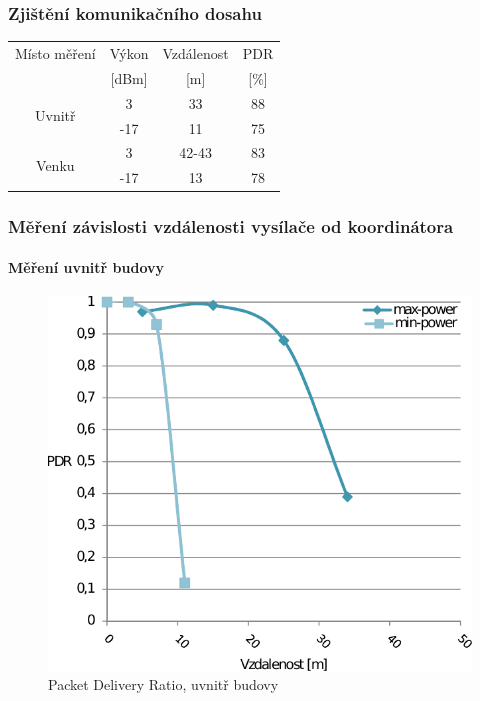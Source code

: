 \documentclass{beamer}
\begin{document}
	\begin{frame}
	\frametitle{Zjištění komunikačního dosahu}
	\begin{table}[ht!]
	\centering
	\begin{tabular}{|c|c|c|c|} \hline
	Místo měření& Výkon & Vzdálenost & PDR \\
	& [dBm] & [m] & [\%] \\ \hline \hline
	\multirow{2}{*}{Uvnitř} & 3 & 33 & 88 \\
	& -17 & 11 & 75 \\ \hline

	\multirow{2}{*}{Venku} & 3 & 42-43 & 83 \\
	& -17 & 13 & 78 \\ \hline
	\end{tabular}
	\end{table}
	\end{frame}

	\begin{frame}
	\frametitle{Měření závislosti vzdálenosti vysílače od koordinátora}
	\framesubtitle{Měření uvnitř budovy}
	\begin{figure}[!ht]
	\centering%
	\includegraphics[scale=0.7, keepaspectratio]{2-pdr}%
	\caption{Packet Delivery Ratio, uvnitř budovy}
	\end{figure}
	\end{frame}
\end{document}
